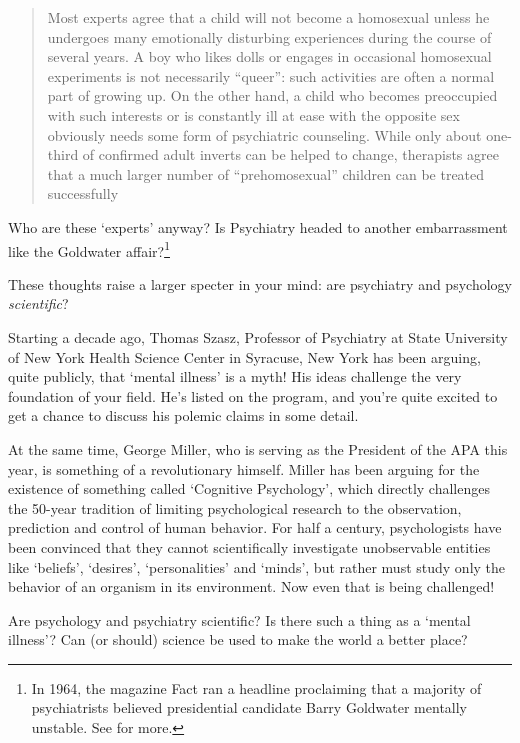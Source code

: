 \begin{refsection}
\begin{quote}

Most experts agree that a child will not become a homosexual unless he undergoes many emotionally disturbing experiences during the course of several years. A boy who likes dolls or engages in occasional homosexual experiments is not necessarily ``queer'': such activities are often a normal part of growing up. On the other hand, a child who becomes preoccupied with such interests or is constantly ill at ease with the opposite sex obviously needs some form of psychiatric counseling. While only about one-third of confirmed adult inverts can be helped to change, therapists agree that a much larger number of ``prehomosexual'' children can be treated successfully
\end{quote}

Who are these `experts' anyway? Is Psychiatry headed to another embarrassment like the Goldwater affair?\footnote{In 1964, the magazine Fact ran a headline proclaiming that a majority of psychiatrists believed presidential candidate Barry Goldwater mentally unstable. See  for more.}

These thoughts raise a larger specter in your mind: are psychiatry and psychology \emph{scientific}?

Starting a decade ago, Thomas Szasz, Professor of Psychiatry at State University of New York Health Science Center in Syracuse, New York has been arguing, quite publicly, that `mental illness' is a myth! His ideas challenge the very foundation of your field. He's listed on the program, and you're quite excited to get a chance to discuss his polemic claims in some detail.

At the same time, George Miller, who is serving as the President of the APA this year, is something of a revolutionary himself. Miller has been arguing for the existence of something called `Cognitive Psychology', which directly challenges the 50-year tradition of limiting psychological research to the observation, prediction and control of human behavior. For half a century, psychologists have been convinced that they cannot scientifically investigate unobservable entities like `beliefs', `desires', `personalities' and `minds', but rather must study only the behavior of an organism in its environment. Now even that is being challenged!

Are psychology and psychiatry scientific? Is there such a thing as a `mental illness'? Can (or should) science be used to make the world a better place? 


\end{refsection}
